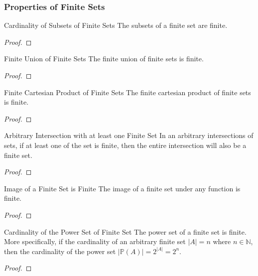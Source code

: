 \subsubsection{Properties of Finite Sets}
\begin{Theorem}{Cardinality of Subsets of Finite Sets}\label{cardinality_subset_finite_set}
    The subsets of a finite set are finite.
\end{Theorem}
\begin{proof}
    
\end{proof}
\begin{Theorem}{Finite Union of Finite Sets}\label{finite_union_finite_set}
    The finite union of finite sets is finite.
\end{Theorem}
\begin{proof}
    
\end{proof}
\begin{Theorem}{Finite Cartesian Product of Finite Sets}\label{finite_product_finite_set}
    The finite cartesian product of finite sets is finite.
\end{Theorem}
\begin{proof}
    
\end{proof}
\begin{Theorem}{Arbitrary Intersection with at least one Finite Set}\label{arbitrary_intersection_with_at_least_one_finite_set}
    In an arbitrary intersections of sets, if at least one of the set is finite, then the entire intersection will also be a finite set.
\end{Theorem}
\begin{proof}
    
\end{proof}
\begin{Theorem}{Image of a Finite Set is Finite}\label{image_of_a_finite_set_is_finite}
    The image of a finite set under any function is finite.
\end{Theorem}
\begin{proof}
    
\end{proof}
\begin{Theorem}{Cardinality of the Power Set of Finite Set}\label{cardinality_of_power_set_of_finite_set}
    The power set of a finite set is finite. More specifically, if the cardinality of an arbitrary finite set $|A|=n$ where $n\in\mathbb{N}$, then the cardinality of the power set $|\mathbb{P}(A)|=2^{|A|}=2^n$.
\end{Theorem}
\begin{proof}
    
\end{proof}
